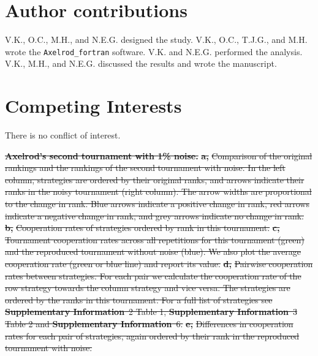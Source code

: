 \documentclass{article}
\newcommand{\AXLFortran}{\texttt{Axelrod\_fortran}}
\newcommand{\SI}{\textbf{Supplementary Information}}
\providecommand{\DIFdeltex}[1]{{\protect\color{red}\sout{#1}}}                      %
\providecommand{\DIFdelbegin}{} %
\providecommand{\DIFdelFL}[1]{\DIFdel{#1}} %
\providecommand{\DIFdel}[1]{\texorpdfstring{\DIFdeltex{#1}}{}} %
\newcommand{\DIFscaledelfig}{0.5}
\newlength{\DIFdelgraphicswidth} %
\newlength{\DIFdelgraphicsheight} %
\newcommand{\DIFdelincludegraphics}[2][]{%
\sbox{\DIFdelgraphicsbox}{\DIFOincludegraphics[#1]{#2}}%
\settoboxwidth{\DIFdelgraphicswidth}{\DIFdelgraphicsbox} %
\settoboxtotalheight{\DIFdelgraphicsheight}{\DIFdelgraphicsbox} %
\scalebox{\DIFscaledelfig}{%
\parbox[b]{\DIFdelgraphicswidth}{\usebox{\DIFdelgraphicsbox}\\[-\baselineskip] \rule{\DIFdelgraphicswidth}{0em}}\llap{\resizebox{\DIFdelgraphicswidth}{\DIFdelgraphicsheight}{%
\setlength{\unitlength}{\DIFdelgraphicswidth}%
\begin{picture}(1,1)%
\thicklines\linethickness{2pt} %
{\color[rgb]{1,0,0}\put(0,0){\framebox(1,1){}}}%
{\color[rgb]{1,0,0}\put(0,0){\line( 1,1){1}}}%
{\color[rgb]{1,0,0}\put(0,1){\line(1,-1){1}}}%
\end{picture}%
}\hspace*{3pt}}} %
} %
\DeclareRobustCommand{\DIFdelbegin}{\DIFOdelbegin \let\includegraphics\DIFdelincludegraphics} %
\begin{document}
\section*{Author contributions}
V.K., O.C., M.H.,  and N.E.G. designed the study. 
V.K., O.C., T.J.G., and M.H. wrote the \AXLFortran{} software. 
V.K. and N.E.G. performed the analysis.
V.K., M.H., and N.E.G. discussed the results and wrote the manuscript.

\section*{Competing Interests}

There is no conflict of interest.

\DIFdelbegin %
{%
\textbf{\DIFdelFL{Axelrod's second tournament with 1\% noise.}}
\textbf{\DIFdelFL{a,}} %
\DIFdelFL{Comparison of the original rankings and the rankings of the second
    tournament with noise. In the left column, strategies are ordered by their
    original ranks, and arrows indicate their ranks in the noisy tournament (right
    column). The arrow widths are proportional to the change in rank. Blue arrows
    indicate a positive change in rank, red arrows indicate a negative change in
    rank, and grey arrows indicate no change in rank.
    }\textbf{\DIFdelFL{b,}} %
\DIFdelFL{Cooperation rates of strategies ordered by rank in this tournament.
    }\textbf{\DIFdelFL{c,}} %
\DIFdelFL{Tournament cooperation rates across all repetitions for
    this tournament (green) and the reproduced tournament without noise (blue).
    We also plot the average cooperation rate (green or blue line) and report its value.
    }\textbf{\DIFdelFL{d,}} %
\DIFdelFL{Pairwise cooperation rates between strategies. For each
    pair we calculate the cooperation rate of the row strategy towards the column
    strategy and vice versa. The strategies are ordered by the ranks in this
    tournament. For a full list of strategies see \SI~2 Table 1, \SI~3 Table 2
    and \SI~6.
    }\textbf{\DIFdelFL{e,}} %
\DIFdelFL{Differences in cooperation rates for each pair of strategies, again 
    ordered by their rank in the reproduced tournament with noise.}}
\end{document}
